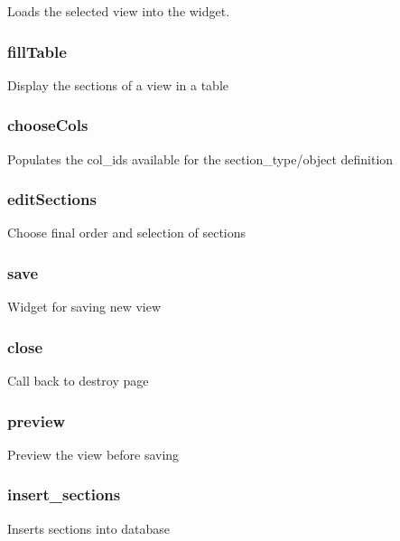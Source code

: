 \documentclass{article}
\begin{document}
Loads the selected view into the widget.

\subsubsection*{fillTable\label{BuildView_fillTable}}


Display the sections of a view in a table

\subsubsection*{chooseCols\label{BuildView_chooseCols}}


Populates the col\_ids available for the section\_type/object definition

\subsubsection*{editSections\label{BuildView_editSections}}


Choose final order and selection of sections

\subsubsection*{save\label{BuildView_save}}


Widget for saving new view

\subsubsection*{close\label{BuildView_close}}


Call back to destroy page

\subsubsection*{preview\label{BuildView_preview}}


Preview the view before saving

\subsubsection*{insert\_sections\label{BuildView_insert_sections}}


Inserts sections into database
\end{document}
